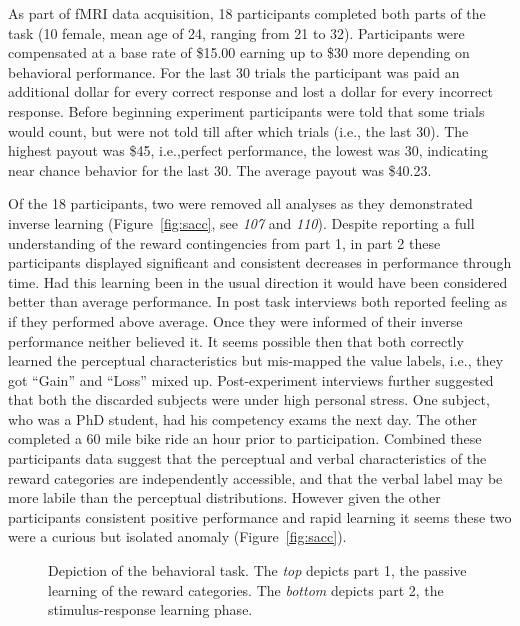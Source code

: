 As part of fMRI data acquisition, 18 participants completed both parts of the task (10 female, mean age of 24, ranging from 21 to 32). Participants were compensated at a base rate of \$15.00 earning up to \$30 more depending on behavioral performance. For the last 30 trials the participant was paid an additional dollar for every correct response and lost a dollar for every incorrect response.  Before beginning experiment participants were told that some trials would count, but were not told till after which trials (i.e., the last 30).  The highest payout was \$45, i.e.,perfect performance, the lowest was 30, indicating near chance behavior for the last 30.  The average payout was \$40.23.

Of the 18 participants, two were removed all analyses as they demonstrated inverse learning (Figure~\ref{fig:sacc}, see \emph{107} and \emph{110}).  Despite reporting a full understanding of the reward contingencies from part 1, in part 2 these participants displayed significant and consistent decreases in performance through time.  Had this learning been in the usual direction it would have been considered better than average performance.  In post task interviews both reported feeling as if they performed above average.  Once they were informed of their inverse performance neither believed it.  It seems possible then that both correctly learned the perceptual characteristics but mis-mapped the value labels, i.e., they got ``Gain'' and ``Loss''  mixed up.  Post-experiment interviews further suggested that both the discarded subjects were under high personal stress.  One subject, who was a PhD student, had his competency exams the next day.  The other completed a 60 mile bike ride an hour prior to participation.  Combined these participants data suggest that the perceptual and verbal characteristics of the reward categories are independently accessible, and that the verbal label may be more labile than the perceptual distributions.  However given the other participants consistent positive performance and rapid learning it seems these two were a curious but isolated anomaly (Figure~\ref{fig:sacc}).

\begin{figure}[tp]
    \centering
    \caption{Depiction of the behavioral task.  The \emph{top} depicts part 1, the passive learning of the reward categories.  The \emph{bottom} depicts part 2, the stimulus-response learning phase.}
    \label{fig:task}
\end{figure}

